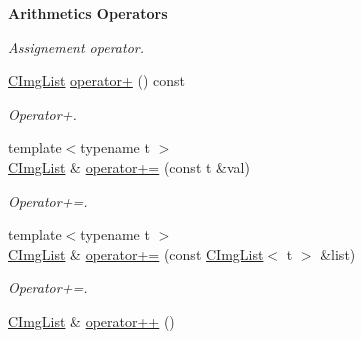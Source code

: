 \begin{Indent}{\bf Arithmetics Operators}
\begin{DoxyCompactItemize}
\begin{DoxyCompactList}\small\item\em Assignement operator. \item\end{DoxyCompactList}\item 
\hypertarget{structcimg__library_1_1_c_img_list_a700e85091aeb1e05a27dbbb3be76d7ea}{
\hyperlink{structcimg__library_1_1_c_img_list}{CImgList} \hyperlink{structcimg__library_1_1_c_img_list_a700e85091aeb1e05a27dbbb3be76d7ea}{operator+} () const }
\label{structcimg__library_1_1_c_img_list_a700e85091aeb1e05a27dbbb3be76d7ea}

\begin{DoxyCompactList}\small\item\em Operator+. \item\end{DoxyCompactList}\item 
\hypertarget{structcimg__library_1_1_c_img_list_a0e668b719573d0c3f1103d1fa968c184}{
{\footnotesize template$<$typename t $>$ }\\\hyperlink{structcimg__library_1_1_c_img_list}{CImgList} \& \hyperlink{structcimg__library_1_1_c_img_list_a0e668b719573d0c3f1103d1fa968c184}{operator+=} (const t \&val)}
\label{structcimg__library_1_1_c_img_list_a0e668b719573d0c3f1103d1fa968c184}

\begin{DoxyCompactList}\small\item\em Operator+=. \item\end{DoxyCompactList}\item 
\hypertarget{structcimg__library_1_1_c_img_list_a0a87685e477d6354379b7cc2e6b875e8}{
{\footnotesize template$<$typename t $>$ }\\\hyperlink{structcimg__library_1_1_c_img_list}{CImgList} \& \hyperlink{structcimg__library_1_1_c_img_list_a0a87685e477d6354379b7cc2e6b875e8}{operator+=} (const \hyperlink{structcimg__library_1_1_c_img_list}{CImgList}$<$ t $>$ \&list)}
\label{structcimg__library_1_1_c_img_list_a0a87685e477d6354379b7cc2e6b875e8}

\begin{DoxyCompactList}\small\item\em Operator+=. \item\end{DoxyCompactList}\item 
\hypertarget{structcimg__library_1_1_c_img_list_a5313d2aede4ed008786a9acfefa241c5}{
\hyperlink{structcimg__library_1_1_c_img_list}{CImgList} \& \hyperlink{structcimg__library_1_1_c_img_list_a5313d2aede4ed008786a9acfefa241c5}{operator++} ()}
\label{structcimg__library_1_1_c_img_list_a5313d2aede4ed008786a9acfefa241c5}


\end{DoxyCompactItemize}
\end{Indent}
